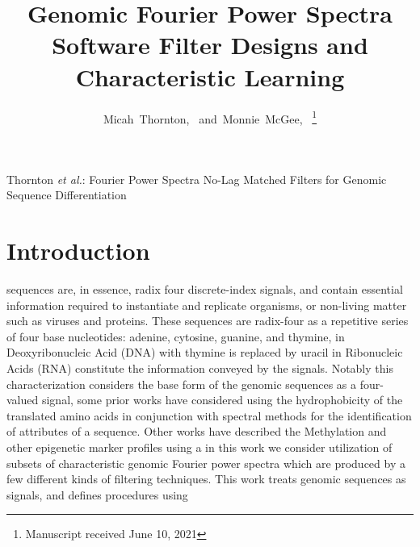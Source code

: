 \documentclass[12pt,journal,compsoc]{IEEEtran}
\begin{document}
\title{Genomic Fourier Power Spectra Software Filter Designs and Characteristic Learning}
\author{Micah~Thornton,~
        and~Monnie~McGee,~%
% 
\thanks{Manuscript received June 10, 2021}}%

%
{Thornton \MakeLowercase{\textit{et al.}}: Fourier Power Spectra No-Lag Matched Filters for Genomic Sequence Differentiation}

\maketitle

\IEEEdisplaynontitleabstractindextext

\IEEEpeerreviewmaketitle

\section{Introduction}
\label{sec:int}

 sequences are, in essence, radix four discrete-index signals, 
and contain essential information required to instantiate and replicate organisms, or non-living matter 
such as viruses and proteins.
These sequences are radix-four as a repetitive series of four base nucleotides: adenine, cytosine, guanine, 
and thymine, in Deoxyribonucleic Acid (DNA) with thymine is replaced by uracil in Ribonucleic Acids 
(RNA) constitute the information conveyed by the signals. 
Notably this characterization considers the base form of the genomic sequences as a four-valued signal, 
some prior works have considered using the hydrophobicity of the translated amino acids in conjunction 
with spectral methods for the identification of attributes of a sequence. \cite{Shu17} 
Other works have described the Methylation and other epigenetic marker profiles using a 
in this work we consider utilization of subsets of characteristic genomic Fourier power spectra which are
produced by a few different kinds of filtering techniques. 
This work treats genomic sequences as signals, and defines procedures using 
\end{document}
